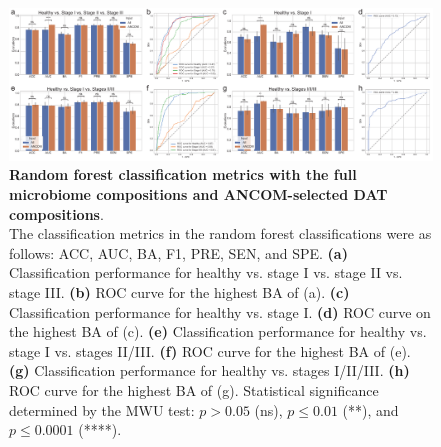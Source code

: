\documentclass[11pt, a4paper, onecolumn, oneside]{report}
\begin{document}
            \begin{figure}[p]
                \centering
                \includegraphics[width=\linewidth]{Figures/Periodontitis/Figure_R05.pdf}
                \caption[Random forest classification metrics with the full microbiome compositions and ANCOM-selected DAT compositions]{\textbf{Random forest classification metrics with the full microbiome compositions and ANCOM-selected DAT compositions}. \\
                    The classification metrics in the random forest classifications were as follows: ACC, AUC, BA, F1, PRE, SEN, and SPE. \textbf{(a)} Classification performance for healthy vs. stage I vs. stage II vs. stage III. \textbf{(b)} ROC curve for the highest BA of (a). \textbf{(c)} Classification performance for healthy vs. stage I. \textbf{(d)} ROC curve on the highest BA of (c). \textbf{(e)} Classification performance for healthy vs. stage I vs. stages II/III. \textbf{(f)} ROC curve for the highest BA of (e). \textbf{(g)} Classification performance for healthy vs. stages I/II/III. \textbf{(h)} ROC curve for the highest BA of (g). Statistical significance determined by the MWU test: $p > 0.05$ (ns), $p \le 0.01$ (**), and $p \le 0.0001$ (****).}
                \label{fig:Periodontitis-full}
            \end{figure}
            \clearpage
\end{document}
